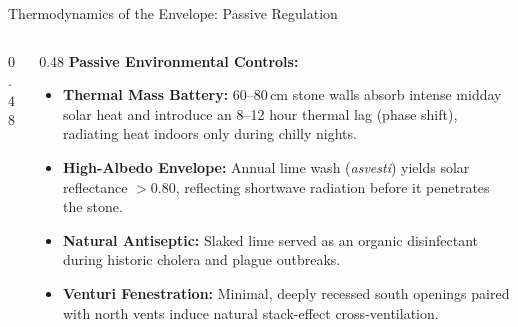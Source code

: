 \begin{frame}[label=thermo]{Thermodynamics of the Envelope: Passive Regulation}
  \begin{columns}[T, onlytextwidth]
    \begin{column}{0.48\textwidth}
    \end{column}
    
    \begin{column}{0.48\textwidth}
      \textbf{\color{aegeanblue}Passive Environmental Controls:}
      \vspace{0.2em}
      \begin{itemize}
        \setlength{\itemsep}{0.2em}
        \item \textbf{Thermal Mass Battery:} 60--80\,cm stone walls absorb intense midday solar heat and introduce an 8--12 hour thermal lag (phase shift), radiating heat indoors only during chilly nights.
        \item \textbf{High-Albedo Envelope:} Annual lime wash (\textit{asvesti}) yields solar reflectance $>0.80$, reflecting shortwave radiation before it penetrates the stone.
        \item \textbf{Natural Antiseptic:} Slaked lime served as an organic disinfectant during historic cholera and plague outbreaks.
        \item \textbf{Venturi Fenestration:} Minimal, deeply recessed south openings paired with north vents induce natural stack-effect cross-ventilation.
      \end{itemize}
    \end{column}
  \end{columns}
\end{frame}

